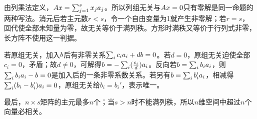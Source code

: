 \label{der:3-1}
由列乘法定义，$Ax=\sum_{j=1}^s x_ja_j$。所以列组无关与$Ax=0$只有零解是同一命题的两种写法。消元后若主元数$r<s$，令一个自由变量为1就产生非零解；若$r=s$，回代使全部未知量为零，故无关等价于满列秩。方形时满秩又等价于行列式非零，长方阵不使用这一判据。

若原组无关，加入$b$后有非零关系$\sum_i c_ia_i+db=0$。若$d=0$，原组无关迫使全部$c_i=0$，矛盾；故$d\ne0$，可解得$b=-\sum_i(\frac{c_i}{d})a_i$。反向若$b=\sum_i b_ia_i$，则$\sum_i b_ia_i-b=0$是加入后的一条非零系数关系。若另有$b=\sum_i b_i'a_i$，相减得$\sum_i(b_i-b_i')a_i=0$，原组无关给$b_i=b_i'$，表示唯一。

最后，$n\times s$矩阵的主元最多$n$个；当$s>n$时不能满列秩，所以$n$维空间中超过$n$个向量必相关。
